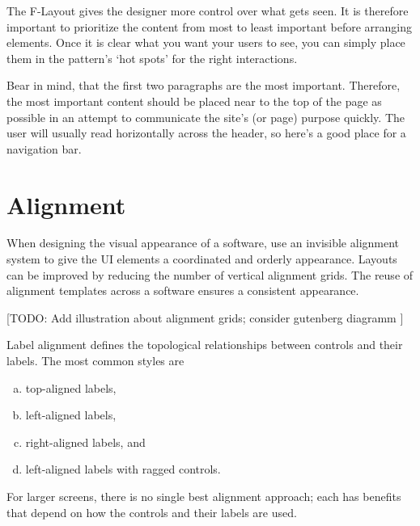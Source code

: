 The F-Layout gives the designer more control over what gets seen.
It is therefore important to prioritize the content from most to least important before arranging elements. Once it is clear what you want your users to see, you can simply place them in the pattern’s ‘hot spots’ for the right interactions.

Bear in mind, that the first two paragraphs are the most important. 
Therefore, the most important content should be placed near to the top of the page as possible in an attempt to communicate the site’s (or page) purpose quickly. The user will usually read horizontally across the header, so here’s a good place for a navigation bar.



\section{Alignment} %
\label{sec:alignment}


When designing the visual appearance of a software, use an invisible alignment system to give the UI elements a coordinated and orderly appearance. 
Layouts can be improved by reducing the number of vertical alignment grids. 
The reuse of alignment templates across a software ensures a consistent appearance.

[TODO: Add illustration about alignment grids; consider gutenberg diagramm ]

Label alignment defines the topological relationships between controls and their labels. The most common styles are 
\begin{enumerate}[(a)]
	\item top-aligned labels,
	\item left-aligned labels,
	\item right-aligned labels, and
	\item left-aligned labels with ragged controls.
\end{enumerate}
For larger screens, there is no single best alignment approach; each has benefits that depend on how the controls and their labels are used. 


